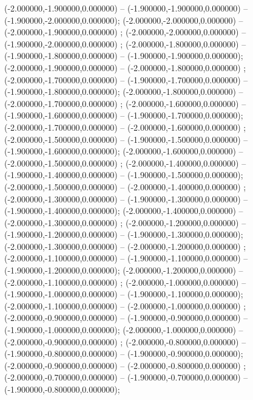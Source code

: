  (-2.000000,-1.900000,0.000000) -- (-1.900000,-1.900000,0.000000) -- (-1.900000,-2.000000,0.000000);
 (-2.000000,-2.000000,0.000000) -- (-2.000000,-1.900000,0.000000) ;
 (-2.000000,-2.000000,0.000000) -- (-1.900000,-2.000000,0.000000) ;
 (-2.000000,-1.800000,0.000000) -- (-1.900000,-1.800000,0.000000) -- (-1.900000,-1.900000,0.000000);
 (-2.000000,-1.900000,0.000000) -- (-2.000000,-1.800000,0.000000) ;
 (-2.000000,-1.700000,0.000000) -- (-1.900000,-1.700000,0.000000) -- (-1.900000,-1.800000,0.000000);
 (-2.000000,-1.800000,0.000000) -- (-2.000000,-1.700000,0.000000) ;
 (-2.000000,-1.600000,0.000000) -- (-1.900000,-1.600000,0.000000) -- (-1.900000,-1.700000,0.000000);
 (-2.000000,-1.700000,0.000000) -- (-2.000000,-1.600000,0.000000) ;
 (-2.000000,-1.500000,0.000000) -- (-1.900000,-1.500000,0.000000) -- (-1.900000,-1.600000,0.000000);
 (-2.000000,-1.600000,0.000000) -- (-2.000000,-1.500000,0.000000) ;
 (-2.000000,-1.400000,0.000000) -- (-1.900000,-1.400000,0.000000) -- (-1.900000,-1.500000,0.000000);
 (-2.000000,-1.500000,0.000000) -- (-2.000000,-1.400000,0.000000) ;
 (-2.000000,-1.300000,0.000000) -- (-1.900000,-1.300000,0.000000) -- (-1.900000,-1.400000,0.000000);
 (-2.000000,-1.400000,0.000000) -- (-2.000000,-1.300000,0.000000) ;
 (-2.000000,-1.200000,0.000000) -- (-1.900000,-1.200000,0.000000) -- (-1.900000,-1.300000,0.000000);
 (-2.000000,-1.300000,0.000000) -- (-2.000000,-1.200000,0.000000) ;
 (-2.000000,-1.100000,0.000000) -- (-1.900000,-1.100000,0.000000) -- (-1.900000,-1.200000,0.000000);
 (-2.000000,-1.200000,0.000000) -- (-2.000000,-1.100000,0.000000) ;
 (-2.000000,-1.000000,0.000000) -- (-1.900000,-1.000000,0.000000) -- (-1.900000,-1.100000,0.000000);
 (-2.000000,-1.100000,0.000000) -- (-2.000000,-1.000000,0.000000) ;
 (-2.000000,-0.900000,0.000000) -- (-1.900000,-0.900000,0.000000) -- (-1.900000,-1.000000,0.000000);
 (-2.000000,-1.000000,0.000000) -- (-2.000000,-0.900000,0.000000) ;
 (-2.000000,-0.800000,0.000000) -- (-1.900000,-0.800000,0.000000) -- (-1.900000,-0.900000,0.000000);
 (-2.000000,-0.900000,0.000000) -- (-2.000000,-0.800000,0.000000) ;
 (-2.000000,-0.700000,0.000000) -- (-1.900000,-0.700000,0.000000) -- (-1.900000,-0.800000,0.000000);
